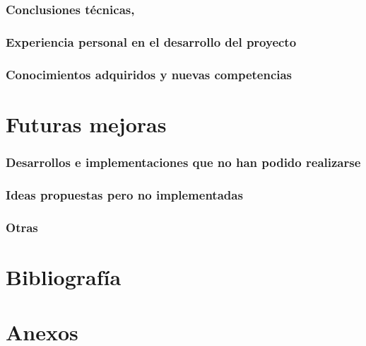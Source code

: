 \documentclass{article}
\begin{document}
\subsubsection{Conclusiones técnicas,}
\subsubsection{Experiencia personal en el desarrollo del proyecto}
\subsubsection{Conocimientos adquiridos y nuevas competencias}
\section{Futuras mejoras}
\subsubsection{Desarrollos e implementaciones que no han podido realizarse}
\subsubsection{Ideas propuestas pero no implementadas}
\subsubsection{Otras}
\section{Bibliografía}
\section{Anexos}
\end{document}
